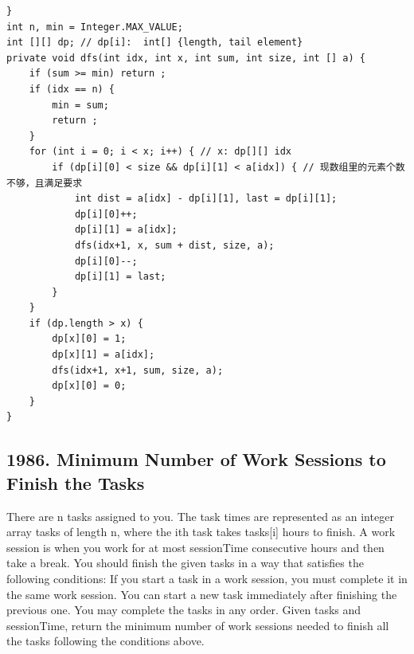 \documentclass[9pt, b5paaper]{book}
\begin{document}
\begin{enumerate}
\begin{verbatim}
}
int n, min = Integer.MAX_VALUE;
int [][] dp; // dp[i]:  int[] {length, tail element}
private void dfs(int idx, int x, int sum, int size, int [] a) {
    if (sum >= min) return ;
    if (idx == n) {
        min = sum;
        return ;
    }
    for (int i = 0; i < x; i++) { // x: dp[][] idx
        if (dp[i][0] < size && dp[i][1] < a[idx]) { // 现数组里的元素个数不够，且满足要求
            int dist = a[idx] - dp[i][1], last = dp[i][1];
            dp[i][0]++;
            dp[i][1] = a[idx];
            dfs(idx+1, x, sum + dist, size, a);
            dp[i][0]--;
            dp[i][1] = last;
        }
    }
    if (dp.length > x) {
        dp[x][0] = 1;
        dp[x][1] = a[idx];
        dfs(idx+1, x+1, sum, size, a);
        dp[x][0] = 0;
    }
}
\end{verbatim}
\end{enumerate}

\subsection{1986. Minimum Number of Work Sessions to Finish the Tasks}
\label{sec-8-0-2}
There are n tasks assigned to you. The task times are represented as an integer array tasks of length n, where the ith task takes tasks[i] hours to finish. A work session is when you work for at most sessionTime consecutive hours and then take a break.
You should finish the given tasks in a way that satisfies the following conditions:
If you start a task in a work session, you must complete it in the same work session.
You can start a new task immediately after finishing the previous one.
You may complete the tasks in any order.
Given tasks and sessionTime, return the minimum number of work sessions needed to finish all the tasks following the conditions above.
\end{document}
